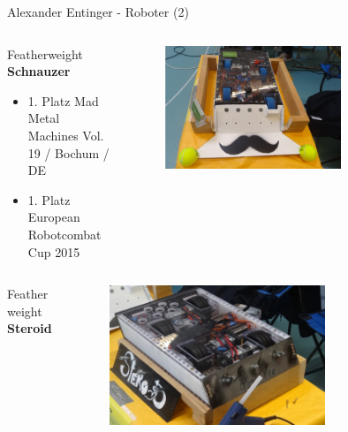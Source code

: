 \documentclass{beamer}
\begin{document}
\begin{frame}{Alexander Entinger - Roboter (2)}
\begin{columns}
 \begin{column}{0.5\textwidth}
  \begin{large}Featherweight \textbf{Schnauzer}\end{large}
  \begin{itemize}
   \item 1. Platz Mad Metal Machines Vol. 19 / Bochum / DE
   \item 1. Platz European Robotcombat Cup 2015
  \end{itemize}
 \end{column}
 \begin{column}{0.5\textwidth}
  \begin{figure}[H]
   \centering
   \includegraphics[width=0.7\textwidth]{./images/robot-schnauzer.jpg}
   \label{fig:robot-schnauzer}
  \end{figure}
 \end{column}
\end{columns}

\begin{columns}
 \begin{column}{0.5\textwidth}
  \begin{large}Featherweight \textbf{Steroid}\end{large}
 \end{column}
 \begin{column}{0.5\textwidth}
  \begin{figure}[H]
   \centering
   \includegraphics[width=0.7\textwidth]{./images/robot-steroid.jpg}
   \label{fig:robot-steroid}
  \end{figure}
 \end{column}
\end{columns}
\end{frame}
\end{document}
